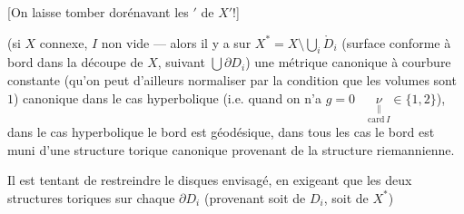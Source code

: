 
[On laisse tomber dorénavant les $'$ de $X'$!]

 (si   $X$ connexe, $I$ non vide --- alors  il y a sur $X^*=X\setminus\bigcup_i\mathring D_i$ (surface conforme à bord  dans la découpe de $X$, suivant $\bigcup\partial D_i$) une  métrique  canonique à courbure constante (qu'on peut d'ailleurs normaliser par la condition que les volumes sont $1$)   canonique  dans le cas hyperbolique (i.e. quand on n'a  $g=0\quad\underset{\mathrm{card}\,I}{\underset{\scriptscriptstyle\parallel}{\nu}}\in\{1,2\}$), dans le cas hyperbolique le bord est géodésique,
dans tous les cas le bord est muni d'une structure torique canonique provenant de la structure riemannienne.

Il est tentant de restreindre le disques envisagé, en exigeant que les deux structures toriques sur  chaque $\partial D_i$ (provenant soit de $D_i$, soit de $X^*$)
